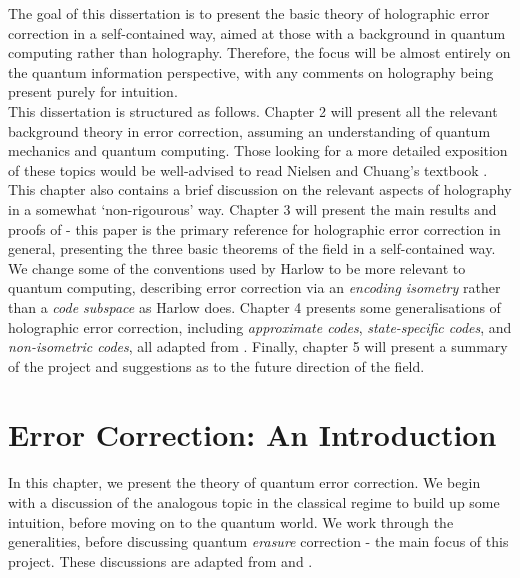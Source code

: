 \documentclass[12pt,a4paper]{report}
\numberwithin{equation}{section}
\theoremstyle{definition}
\theoremstyle{theorem}
\theoremstyle{theorem}
\theoremstyle{example}
\theoremstyle{definition}
\begin{document}
The goal of this dissertation is to present the basic theory of holographic error correction in a self-contained way, aimed at those with a background in quantum computing rather than holography. Therefore, the focus will be almost entirely on the quantum information perspective, with any comments on holography being present purely for intuition.\\
This dissertation is structured as follows. Chapter 2 will present all the relevant background theory in error correction, assuming an understanding of quantum mechanics and quantum computing. Those looking for a more detailed exposition of these topics would be well-advised to read Nielsen and Chuang's textbook \cite{NielsenChuang}. This chapter also contains a brief discussion on the relevant aspects of holography in a somewhat `non-rigourous' way. Chapter 3 will present the main results and proofs of \cite{Harlow} - this paper is the primary reference for holographic error correction in general, presenting the three basic theorems of the field in a self-contained way. We change some of the conventions used by Harlow to be more relevant to quantum computing, describing error correction via an \textit{encoding isometry} rather than a \textit{code subspace} as Harlow does. Chapter 4 presents some generalisations of holographic error correction, including \textit{approximate codes}, \textit{state-specific codes}, and \textit{non-isometric codes}, all adapted from \cite{QMS}. Finally, chapter 5 will present a summary of the project and suggestions as to the future direction of the field.


\chapter{Error Correction: An Introduction}

In this chapter, we present the theory of quantum error correction. We begin with a discussion of the analogous topic in the classical regime to build up some intuition, before moving on to the quantum world. We work through the generalities, before discussing quantum \textit{erasure} correction - the main focus of this project. These discussions are adapted from \cite{NielsenChuang} and \cite{Harlow}.
\end{document}
